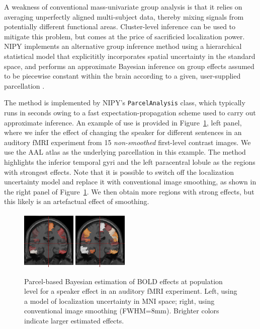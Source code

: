 \documentclass{bioinfo}
\begin{document}
A weakness of conventional mass-univariate group analysis is that it
relies on averaging unperfectly aligned multi-subject data, thereby
mixing signals from potentially different functional
areas. Cluster-level inference can be used to mitigate this problem,
but comes at the price of sacrificied localization power. NIPY
implements an alternative group inference method using a hierarchical
statistical model that explicititly incorporates spatial uncertainty
in the standard space, and performs an approximate Bayesian inference
on group effects assumed to be piecewise constant within the brain
according to a given, user-supplied parcellation
\citep{keller:sinica:08,keller:miccai:09}. 

The method is implemented by NIPY's {\tt ParcelAnalysis} class, which
typically runs in seconds owing to a fast expectation-propagation
scheme \citep{minka:techrep:05} used to carry out approximate
inference. An example of use is provided in
Figure~\ref{fig:parcel_group}, left panel, where we infer the effect
of changing the speaker for different sentences in an auditory fMRI
experiment from 15 {\em non-smoothed} first-level contrast images. We
use the AAL atlas \citep{tzourio:ni:02} as the underlying parcellation
in this example. The method highlights the inferior temporal gyri and
the left paracentral lobule as the regions with strongest
effects. Note that it is possible to switch off the localization
uncertainty model and replace it with conventional image smoothing, as
shown in the right panel of Figure~\ref{fig:parcel_group}. We then
obtain more regions with strong effects, but this likely is an
artefactual effect of smoothing.

\begin{figure}
\begin{center}
  \includegraphics[width=0.23\textwidth]{parcel_group_analysis.png}
  \includegraphics[width=0.23\textwidth]{parcel_group_analysis_naive.png}
\end{center}
\caption{Parcel-based Bayesian estimation of BOLD effects at
  population level for a speaker effect in an auditory fMRI
  experiment. Left, using a model of localization uncertainty in MNI
  space; right, using conventional image smoothing
  (FWHM=8mm). Brighter colors indicate larger estimated effects.}
\label{fig:parcel_group}
\end{figure}
\end{document}
